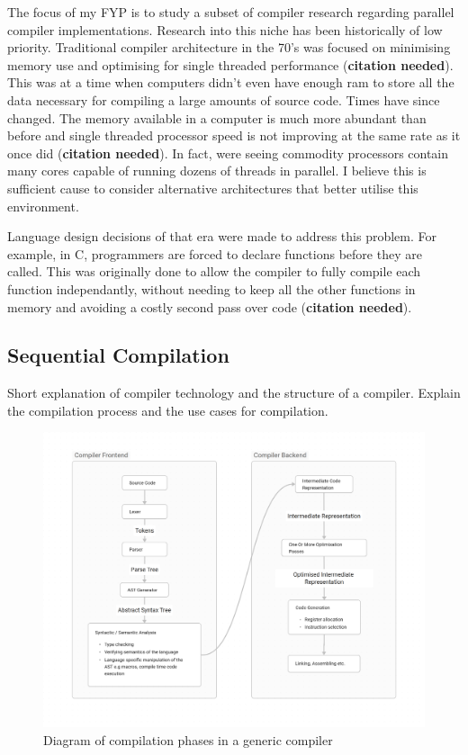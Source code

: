 The focus of my FYP is to study a subset of compiler research regarding parallel
compiler implementations. Research into this niche has been historically
of low priority. Traditional compiler architecture in the 70’s was focused
on minimising memory use and optimising for single threaded performance
(\textbf{citation needed}). This was at a time when computers didn’t even
have enough ram to store all the data necessary for compiling a large amounts
of source code. Times have since changed. The memory available in a computer
is much more abundant than before and single threaded processor speed is not
improving at the same rate as it once did (\textbf{citation needed}). In fact,
were seeing commodity processors contain many cores capable of running dozens of
threads in parallel. I believe this is sufficient cause to consider alternative
architectures that better utilise this environment.

\begin{roughwork}

     Language design decisions of that era were made to address this problem.
     For example, in C, programmers are forced to declare functions before
     they are called. This was originally done to allow the compiler to
     fully compile each function independantly, without needing to keep all
     the other functions in memory and avoiding a costly second pass over
     code (\textbf{citation needed}). 

\end{roughwork}


\subsection{Sequential Compilation}
\begin{sectionplan}
     Short explanation of compiler technology and the structure of a compiler.
     Explain the compilation process and the use cases for compilation.
\end{sectionplan}

\begin{figure}[t]
\includegraphics[width=\linewidth]{images/generic_compiler.png}
\centering
\caption{Diagram of compilation phases in a generic compiler}
\label{fig:compiler}
\end{figure}

